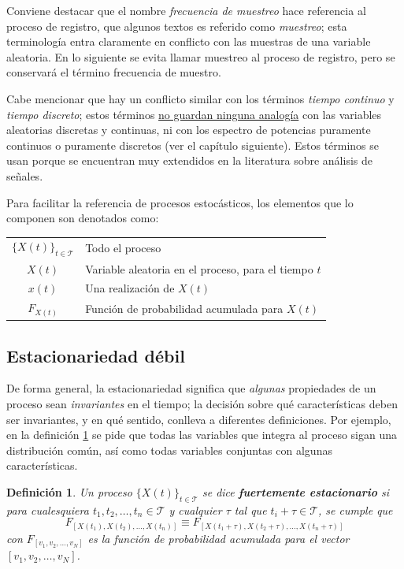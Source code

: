 \documentclass[12pt,letterpaper,draft]{book}
\newtheorem{definicion}{Definición}[chapter]
\newcommand{\xt}{$\{X(t)\}_{t\in \mathcal{T}}$ }
\begin{document}
Conviene destacar que el nombre \textit{frecuencia de muestreo} hace referencia al proceso de registro, que algunos textos es referido como \textit{muestreo}; esta terminología entra claramente en conflicto con las muestras de una variable aleatoria. En lo siguiente se evita llamar muestreo al proceso de registro, pero se conservará el término frecuencia de muestro.

Cabe mencionar que hay un conflicto similar con los términos \textit{tiempo continuo} y \textit{tiempo discreto}; estos términos \underline{no guardan ninguna analogía} con las variables aleatorias discretas y continuas, ni con los espectro de potencias puramente continuos o puramente discretos (ver el capítulo siguiente).
%
Estos términos se usan porque se encuentran muy extendidos en la literatura sobre análisis de señales.

Para facilitar la referencia de procesos estocásticos, los elementos que lo componen son denotados como:
\begin{tabular}{cl}
\xt    & Todo el proceso \\
$X(t)$ & Variable aleatoria en el proceso, para el tiempo $t$ \\
$x(t)$ & Una realización de $X(t)$ \\
$F_{X(t)}$ & Función de probabilidad acumulada para $X(t)$
\end{tabular}

\subsection{Estacionariedad débil}

De forma general, la estacionariedad significa que \textit{algunas} propiedades de un proceso sean \textit{invariantes} en el tiempo; la decisión sobre qué características deben ser invariantes, y en qué sentido, conlleva a diferentes definiciones.
%
Por ejemplo, en la definición \ref{est_fuerte} se pide que todas las variables que integra al proceso sigan una distribución común, así como todas variables conjuntas con algunas características.

\begin{definicion}%
Un proceso \xt se dice \textbf{fuertemente estacionario} si para cualesquiera $t_1, t_2, \dots, t_n \in \mathcal{T}$ y cualquier $\tau$ tal que $t_i + \tau \in \mathcal{T}$, se cumple que
\begin{equation*}
F_{\left[ X(t_1), X(t_2), \dots, X(t_n) \right]} \equiv
F_{\left[ X(t_1 + \tau), X(t_2 + \tau), \dots, X(t_n + \tau) \right]}
\end{equation*}
con $F_{[v_1,v_2,\dots,v_N]}$ es la función de probabilidad acumulada para el vector $[v_1,v_2,\dots,v_N]$.
\label{est_fuerte}
\end{definicion}
\end{document}
